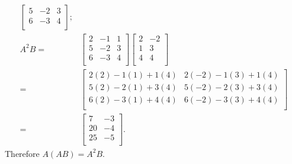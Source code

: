 \documentclass[12pt]{article}
\begin{document}
\begin{enumerate}
\begin{align*}
\begin{bmatrix}
        5 & -2 & 3\\
        6 & -3 & 4\\
      \end{bmatrix};\\
      A^{2}B =&
      \begin{bmatrix}
        2 & -1 & 1\\
        5 & -2 & 3\\
        6 & -3 & 4\\
      \end{bmatrix}
      \begin{bmatrix}
        2 & -2\\
        1 &  3\\
        4 &  4\\
      \end{bmatrix}\\
      =&
      \begin{bmatrix}
        2(2) - 1(1) + 1(4) & 2(-2) - 1(3) + 1(4)\\
        5(2) - 2(1) + 3(4) & 5(-2) - 2(3) + 3(4)\\
        6(2) - 3(1) + 4(4) & 6(-2) - 3(3) + 4(4)\\
      \end{bmatrix}\\
      =&
      \begin{bmatrix}
        7  & -3\\
        20 & -4\\
        25 & -5\\
      \end{bmatrix}.
    \end{align*}
    Therefore $A(AB) = A^{2}B$.


\end{enumerate}
\end{document}
